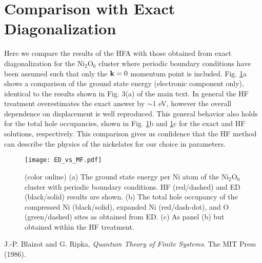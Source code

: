 \documentclass[showpacs,preprintnumbers,amsmath,amssymb,prl,aps,onecolumn,superscriptaddress]{revtex4}
\newcommand{\bk}{{\bf k}}
\begin{document}
\section{Comparison with Exact Diagonalization}
Here we compare the results of the HFA with those obtained from 
exact diagonalization for the Ni$_2$O$_6$ cluster where periodic
boundary conditions  
have been assumed such that only the $\bk = 0$ momentum point is included. 
Fig. \ref{Fig:MF_vs_ED}a shows a comparison of the ground state energy
(electronic component only), identical 
to the results shown in Fig. 3(a) of the main text.  
In general the HF treatment overestimates the exact answer by $\sim 1$ eV, 
however the overall dependence on displacement is well reproduced.  
This general behavior also holds for the total hole occupancies, shown in 
Fig. \ref{Fig:MF_vs_ED}b and \ref{Fig:MF_vs_ED}c for the exact and 
HF solutions, respectively. This comparison gives us confidence that the 
HF method can describe the physics of the nickelates for our choice in 
parameters. 

\begin{figure}
 \texttt{[image: ED\_vs\_MF.pdf]}
 \caption{\label{Fig:MF_vs_ED} (color online)
 (a) The ground state energy per Ni atom of the 
 Ni$_2$O$_6$ cluster with periodic boundary conditions. 
 HF (red/dashed) and ED (black/solid) results are shown.
 (b) The total hole occupancy of the compressed Ni (black/solid), 
 expanded Ni (red/dash-dot), and O (green/dashed) sites as obtained 
 from ED. 
 (c) As panel (b) but obtained within the HF treatment.  
 }
\end{figure}

\begin{thebibliography}{99}
J.-P. Blaizot and G. Ripka, {\it Quantum Theory of Finite Systems}. The MIT Press (1986).
\end{thebibliography}
\end{document}
